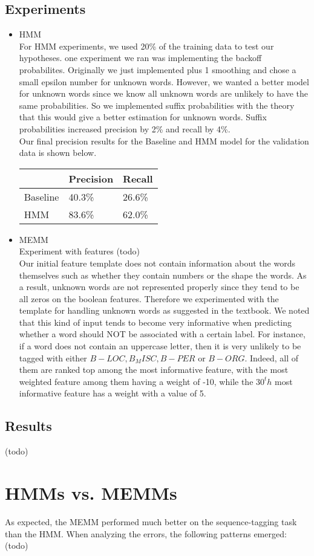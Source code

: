 \documentclass[12pt]{article}
\begin{document}
\subsection{Experiments}
\begin{itemize}
\item HMM\\
For HMM experiments, we used 20\% of the training data to test our hypotheses. one experiment we ran was implementing the backoff probabilites. Originally we just implemented plus 1 smoothing and chose a small epsilon number for unknown words. However, we wanted a better model for unknown words since we know all unknown words are unlikely to have the same probabilities. So we implemented suffix probabilities with the theory that this would give a better estimation for unknown words. Suffix probabilities increased precision by 2\% and recall by 4\%.\\
Our final precision results for the Baseline and HMM model for the validation data is shown below.\\
\newline
\begin{tabular}{|l|l|l|}
\hline
& Precision & Recall \\
\hline
Baseline & 40.3\% & 26.6\%\\
\hline
HMM      & 83.6\% & 62.0\%\\
\hline
\end{tabular}
\item MEMM\\
Experiment with features (todo)\\
Our initial feature template does not contain information about the words themselves such as whether they contain numbers or the shape the words. As a result, unknown words are not represented properly since they tend to be all zeros on the boolean features. Therefore we experimented with the template for handling unknown words as suggested in the textbook. We noted that this kind of input tends to become very informative when predicting whether a word should NOT be associated with a certain label. For instance, if a word does not contain an uppercase letter, then it is very unlikely to be tagged with either $B-LOC, B_MISC, B-PER$ or $B-ORG$. Indeed, all of them are ranked top among the most informative feature, with the most weighted feature among them having a weight of -10, while the $30^th$ most informative feature has a weight with a value of 5.
\end{itemize}
\subsection{Results}
(todo)
\section{HMMs vs. MEMMs}
As expected, the MEMM performed much better on the sequence-tagging task than the HMM. When analyzing the errors, the following patterns emerged: (todo)
\end{document}
